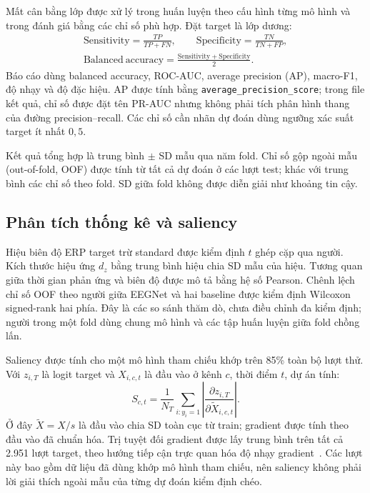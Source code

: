 \documentclass[11pt,a4paper]{article}
\newcommand{\code}[1]{\nolinkurl{#1}}
\begin{document}
Mất cân bằng lớp được xử lý trong huấn luyện theo cấu hình từng mô hình và trong đánh giá bằng các chỉ số phù hợp. Đặt target là lớp dương:
\begin{equation}
\begin{gathered}
\mathrm{Sensitivity}=\frac{TP}{TP+FN},\qquad
\mathrm{Specificity}=\frac{TN}{TN+FP},\\[4pt]
\mathrm{Balanced\ accuracy}=\frac{\mathrm{Sensitivity}+\mathrm{Specificity}}{2}.
\end{gathered}
\end{equation}
Báo cáo dùng balanced accuracy, ROC-AUC, average precision (AP), macro-F1, độ nhạy và độ đặc hiệu. AP được tính bằng \code{average_precision_score}; trong file kết quả, chỉ số được đặt tên PR-AUC nhưng không phải tích phân hình thang của đường precision--recall. Các chỉ số cần nhãn dự đoán dùng ngưỡng xác suất target ít nhất $0{,}5$.

Kết quả tổng hợp là trung bình $\pm$ SD mẫu qua năm fold. Chỉ số gộp ngoài mẫu (out-of-fold, OOF) được tính từ tất cả dự đoán ở các lượt test; khác với trung bình các chỉ số theo fold. SD giữa fold không được diễn giải như khoảng tin cậy.

\subsection{Phân tích thống kê và saliency}
Hiệu biên độ ERP target trừ standard được kiểm định $t$ ghép cặp qua người. Kích thước hiệu ứng $d_z$ bằng trung bình hiệu chia SD mẫu của hiệu. Tương quan giữa thời gian phản ứng và biên độ được mô tả bằng hệ số Pearson. Chênh lệch chỉ số OOF theo người giữa EEGNet và hai baseline được kiểm định Wilcoxon signed-rank hai phía. Đây là các so sánh thăm dò, chưa điều chỉnh đa kiểm định; người trong một fold dùng chung mô hình và các tập huấn luyện giữa fold chồng lấn.

Saliency được tính cho một mô hình tham chiếu khớp trên 85\% toàn bộ lượt thử. Với $z_{i,T}$ là logit target và $X_{i,c,t}$ là đầu vào ở kênh $c$, thời điểm $t$, dự án tính:
\begin{equation}
S_{c,t}=\frac{1}{N_T}\sum_{i:y_i=1}\left|\frac{\partial z_{i,T}}{\partial\widetilde X_{i,c,t}}\right|.
\end{equation}
Ở đây $\widetilde X=X/s$ là đầu vào chia SD toàn cục từ train; gradient được tính theo đầu vào đã chuẩn hóa. Trị tuyệt đối gradient được lấy trung bình trên tất cả 2.951 lượt target, theo hướng tiếp cận trực quan hóa độ nhạy gradient~\cite{saliency}. Các lượt này bao gồm dữ liệu đã dùng khớp mô hình tham chiếu, nên saliency không phải lời giải thích ngoài mẫu của từng dự đoán kiểm định chéo.
\FloatBarrier
\end{document}
